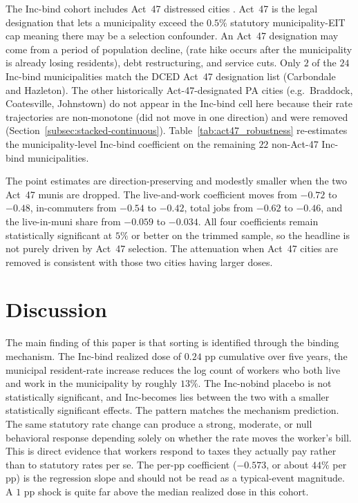 \documentclass[12pt]{article}
\begin{document}
The Inc-bind cohort includes Act~47 distressed cities
\citep{paAct47_1987}. Act~47 is the legal designation that
lets a municipality exceed the $0.5\%$ statutory municipality-EIT
cap meaning there may be a selection confounder. An
Act~47 designation may come from a period of population
decline, (rate hike occurs after the municipality is
already losing residents), debt
restructuring, and service cuts. Only
$2$ of the $24$ Inc-bind municipalities match the DCED Act~47
designation list (Carbondale and Hazleton). The other historically
Act-47-designated PA cities (e.g.\ Braddock, Coatesville, Johnstown)
do not appear in the Inc-bind cell here because their rate trajectories are non-monotone (did not move in one direction) and were removed (Section~\ref{subsec:stacked-continuous}).
Table~\ref{tab:act47_robustness} re-estimates the
municipality-level Inc-bind coefficient on the remaining $22$
non-Act-47 Inc-bind municipalities.



The point estimates are direction-preserving and modestly smaller
when the two Act~47 munis are dropped. The live-and-work
coefficient moves from $-0.72$ to $-0.48$, in-commuters from
$-0.54$ to $-0.42$, total jobs from $-0.62$ to $-0.46$, and the
live-in-muni share from $-0.059$ to $-0.034$. All four coefficients
remain statistically significant at $5\%$ or better on the trimmed
sample, so the headline is not purely driven by Act~47 selection. The
attenuation when Act~47 cities are removed is consistent with those
two cities having larger doses.

\section{Discussion}
\label{sec:discussion}

The main finding of this paper is that sorting is identified through the
binding mechanism. The Inc-bind realized dose of
$0.24$ pp cumulative over five years, the municipal resident-rate
increase reduces the log count of workers who both live and work in
the municipality by roughly $13\%$. The Inc-nobind
placebo is not statistically significant, and Inc-becomes
lies between the two with a smaller statistically significant effects. The pattern matches the mechanism
prediction. The same statutory rate change can produce a strong,
moderate, or null behavioral response depending solely on whether
the rate moves the worker's bill. This is direct evidence that
workers respond to taxes they actually pay rather than to statutory
rates per se. The per-pp coefficient ($-0.573$, or about $44\%$ per
pp) is the regression slope and should not be read as a
typical-event magnitude. A $1$ pp shock is quite far above the median realized dose in this cohort.
\end{document}
